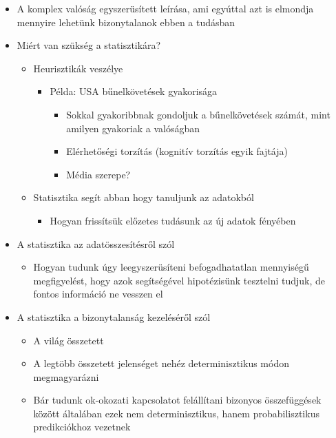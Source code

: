 \documentclass[
  letterpaper,
  DIV=11,
  numbers=noendperiod]{scrreprt}
\providecommand{\tightlist}{%
  \setlength{\itemsep}{0pt}\setlength{\parskip}{0pt}}\usepackage{longtable,booktabs,array}
\begin{document}
\begin{itemize}
\item
  A komplex valóság egyszerüsített leírása, ami egyúttal azt is elmondja
  mennyire lehetünk bizonytalanok ebben a tudásban
\item
  Miért van szükség a statisztikára?

  \begin{itemize}
  \item
    Heurisztikák veszélye

    \begin{itemize}
    \item
      Példa: USA bűnelkövetések gyakorisága

      \begin{itemize}
      \item
        Sokkal gyakoribbnak gondoljuk a bűnelkövetések számát, mint
        amilyen gyakoriak a valóságban
      \item
        Elérhetőségi torzítás (kognitív torzítás egyik fajtája)
      \item
        Média szerepe?
      \end{itemize}
    \end{itemize}
  \item
    Statisztika segít abban hogy tanuljunk az adatokból

    \begin{itemize}
    \tightlist
    \item
      Hogyan frissítsük előzetes tudásunk az új adatok fényében
    \end{itemize}
  \end{itemize}
\item
  A statisztika az adatösszesítésről szól

  \begin{itemize}
  \tightlist
  \item
    Hogyan tudunk úgy leegyszerüsíteni befogadhatatlan mennyiségű
    megfigyelést, hogy azok segítségével hipotézisünk tesztelni tudjuk,
    de fontos információ ne vesszen el
  \end{itemize}
\item
  A statisztika a bizonytalanság kezeléséről szól

  \begin{itemize}
  \item
    A világ összetett
  \item
    A legtöbb összetett jelenséget nehéz determinisztikus módon
    megmagyarázni
  \item
    Bár tudunk ok-okozati kapcsolatot felállítani bizonyos összefüggések
    között általában ezek nem determinisztikus, hanem probabilisztikus
    predikciókhoz vezetnek


\end{itemize}
\end{itemize}
\end{document}
